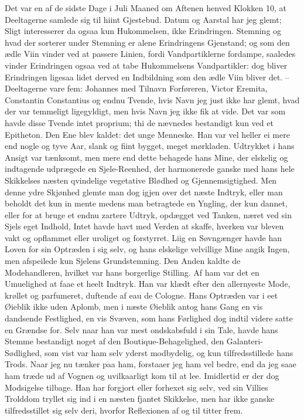 \documentclass[12pt,a4paper]{article}
\begin{document}
Det var en af de sidste Dage i Juli Maaned om Aftenen henved Klokken 10, at Deeltagerne samlede sig til hiint Gjestebud. Datum og Aarstal har jeg glemt; Sligt interesserer da ogsaa kun Hukommelsen, ikke Erindringen. Stemning og hvad der sorterer under Stemning er alene Erindringens Gjenstand; og som den ædle Viin vinder ved at passere Linien, fordi Vandpartiklerne fordampe, saaledes vinder Erindringen ogsaa ved at tabe Hukommelsens Vandpartikler: dog bliver Erindringen ligesaa lidet derved en Indbildning som den ædle Viin bliver det. – Deeltagerne vare fem: Johannes med Tilnavn Forføreren, Victor Eremita, Constantin Constantius og endnu Tvende, hvis Navn jeg just ikke har glemt, hvad der var temmeligt ligegyldigt, men hvis Navn jeg ikke fik at vide. Det var som havde disse Tvende intet proprium; thi de nævnedes bestandigt kun ved et Epitheton. Den Ene blev kaldet: det unge Menneske. Han var vel heller ei mere end nogle og tyve Aar, slank og fiint bygget, meget mørkladen. Udtrykket i hans Ansigt var tænksomt, men mere end dette behagede hans Mine, der elskelig og indtagende udprægede en Sjele-Reenhed, der harmonerede ganske med hans hele Skikkelses næsten qvindelige vegetative Blødhed og Gjennemsigtighed. Men denne ydre Skjønhed glemte man dog igjen over det næste Indtryk, eller man beholdt det kun in mente medens man betragtede en Yngling, der kun dannet, eller for at bruge et endnu zartere Udtryk, opdægget ved Tanken, næret ved sin Sjels eget Indhold, Intet havde havt med Verden at skaffe, hverken var bleven vakt og opflammet eller uroliget og forstyrret. Liig en Søvngænger havde han Loven for sin Optræden i sig selv, og hans elskelige velvillige Mine angik Ingen, men afspeilede kun Sjelens Grundstemning. Den Anden kaldte de Modehandleren, hvilket var hans borgerlige Stilling. Af ham var det en Umuelighed at faae et heelt Indtryk. Han var klædt efter den allernyeste Mode, krøllet og parfumeret, duftende af eau de Cologne. Hans Optræden var i eet Øieblik ikke uden Aplomb, men i næste Øieblik antog hans Gang en vis dandsende Festlighed, en vis Svæven, som hans Førlighed dog indtil videre satte en Grændse for. Selv naar han var mest ondskabsfuld i sin Tale, havde hans Stemme bestandigt noget af den Boutique-Behagelighed, den Galanteri-Sødlighed, som vist var ham selv yderst modbydelig, og kun tilfredsstillede hans Trods. Naar jeg nu tænker paa ham, forstaaer jeg ham vel bedre, end da jeg saae ham træde ud af Vognen og uvilkaarligt kom til at lee. Imidlertid er der dog Modsigelse tilbage. Han har forgjort eller forhexet sig selv, ved sin Villies Trolddom tryllet sig ind i en næsten fjantet Skikkelse, men har ikke ganske tilfredsstillet sig selv deri, hvorfor Reflexionen af og til titter frem.
\end{document}
